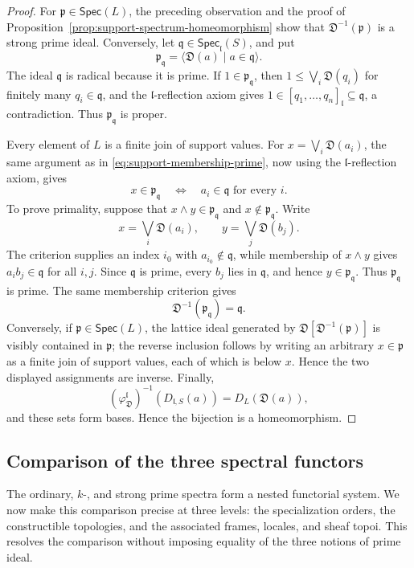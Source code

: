 \documentclass[12pt,leqno]{amsart}
\newcommand{\Spec}{\mathsf{Spec}}
\newcommand{\Specl}{\mathsf{Spec}_{\mathfrak l}}
\theoremstyle{definition}
\numberwithin{equation}{section}
\theoremstyle{remark}
\def\leq{\leqslant}
\begin{document}
\begin{proof}
For \(\mathfrak p\in\Spec(L)\), the preceding observation and the proof of Proposition~\ref{prop:support-spectrum-homeomorphism} show that \(\mathfrak D^{-1}(\mathfrak p)\) is a strong prime ideal. Conversely, let \(\mathfrak q\in\Specl(S)\), and put
\[
\mathfrak p_{\mathfrak q}=\bigl\langle\mathfrak D(a)\mid a\in\mathfrak q\bigr\rangle.
\]
The ideal \(\mathfrak q\) is radical because it is prime. If \(1\in\mathfrak p_{\mathfrak q}\), then
\(1\leq\bigvee_i\mathfrak D(q_i)\) for finitely many \(q_i\in\mathfrak q\), and the $\mathfrak l$-reflection axiom gives
\(1\in[q_1,\ldots,q_n]_{\mathfrak l}\subseteq\mathfrak q\), a contradiction. Thus \(\mathfrak p_{\mathfrak q}\) is proper.

Every element of $L$ is a finite join of support values. For
\(x=\bigvee_i\mathfrak D(a_i)\), the same argument as in \eqref{eq:support-membership-prime}, now using the $\mathfrak l$-reflection axiom, gives
\[
x\in\mathfrak p_{\mathfrak q}
\quad\Longleftrightarrow\quad
a_i\in\mathfrak q\text{ for every }i.
\]
To prove primality, suppose that \(x\wedge y\in\mathfrak p_{\mathfrak q}\) and \(x\notin\mathfrak p_{\mathfrak q}\). Write
\[
x=\bigvee_i\mathfrak D(a_i),\qquad
y=\bigvee_j\mathfrak D(b_j).
\]
The criterion supplies an index \(i_0\) with \(a_{i_0}\notin\mathfrak q\), while membership of \(x\wedge y\) gives \(a_i b_j\in\mathfrak q\) for all $i,j$. Since \(\mathfrak q\) is prime, every \(b_j\) lies in \(\mathfrak q\), and hence \(y\in\mathfrak p_{\mathfrak q}\). Thus \(\mathfrak p_{\mathfrak q}\) is prime. The same membership criterion gives
\[
\mathfrak D^{-1}(\mathfrak p_{\mathfrak q})=\mathfrak q.
\]
Conversely, if \(\mathfrak p\in\Spec(L)\), the lattice ideal generated by \(\mathfrak D[\mathfrak D^{-1}(\mathfrak p)]\) is visibly contained in \(\mathfrak p\); the reverse inclusion follows by writing an arbitrary \(x\in\mathfrak p\) as a finite join of support values, each of which is below $x$. Hence the two displayed assignments are inverse. Finally,
\[
(\varphi^{\mathfrak l}_{\mathfrak D})^{-1}(D_{\mathfrak l,S}(a))
 =D_L(\mathfrak D(a)),
\]
and these sets form bases. Hence the bijection is a homeomorphism.
\end{proof}

\subsection{Comparison of the three spectral functors}\label{subsec:three-spectra}

The ordinary, $k$-, and strong prime spectra form a nested functorial system. We now make this comparison precise at three levels: the specialization orders, the constructible topologies, and the associated frames, locales, and sheaf topoi. This resolves the comparison without imposing equality of the three notions of prime ideal.
\end{document}
